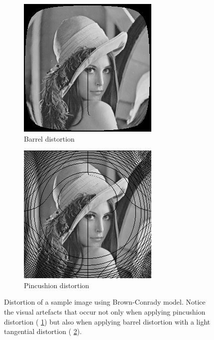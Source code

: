\documentclass[12pt]{article}
\begin{document}
\begin{figure}
\begin{subfigure}{0.30\linewidth}
		\includegraphics[width=\linewidth]{./figures/lena1.jpg}
		\caption{Barrel distortion}
		\label{lena11}
	\end{subfigure}\hfill
	\begin{subfigure}{0.30\linewidth}
		\centering
		\includegraphics[width=\linewidth]{./figures/lena2.jpg}
		\caption{Pincushion distortion}
		\label{lena21}
	\end{subfigure}
	\caption{Distortion of a sample image using Brown-Conrady model. Notice the visual artefacts that occur not only when applying pincushion distortion (\figurename{ \ref{lena11}}) but also when applying barrel distortion with a light tangential distortion (\figurename{ \ref{lena21}}).}
	\label{exlena}
\end{figure}
\end{document}
